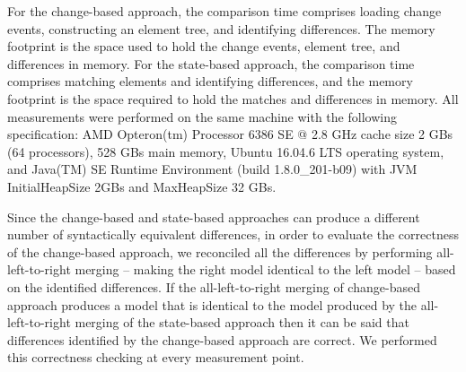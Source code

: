 For the change-based approach, the comparison time comprises loading change events, constructing an element tree, and identifying differences. The memory footprint is the space used to hold the change events, element tree, and differences in memory. For the state-based approach, the comparison time comprises matching elements and identifying differences, and the memory footprint is the space required to hold the matches and differences in memory. All measurements were performed on the same machine with the following specification: AMD Opteron(tm) Processor 6386 SE @ 2.8 GHz cache size 2 GBs (64 processors), 528 GBs main memory, Ubuntu 16.04.6 LTS operating system, and Java(TM) SE Runtime Environment (build 1.8.0\_201-b09) with JVM \textsf{InitialHeapSize} 2GBs and \textsf{MaxHeapSize} 32 GBs.

Since the change-based and state-based approaches can produce a different number of syntactically equivalent differences, in order to evaluate the correctness of the change-based approach, we reconciled all the differences by performing all-left-to-right merging -- making the right model identical to the left model -- based on the identified differences. If the all-left-to-right merging of change-based approach produces a model that is identical to the model produced by the all-left-to-right merging of the state-based approach then it can be said that differences identified by the change-based approach are correct. We performed this correctness checking at every measurement point.

